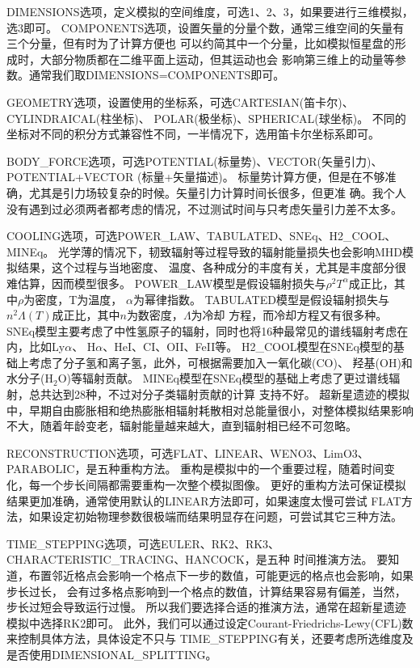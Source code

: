 DIMENSIONS选项，定义模拟的空间维度，可选1、2、3，如果要进行三维模拟，选3即可。
COMPONENTS选项，设置矢量的分量个数，通常三维空间的矢量有三个分量，但有时为了计算方便也
可以约简其中一个分量，比如模拟恒星盘的形成时，大部分物质都在二维平面上运动，但其运动也会
影响第三维上的动量等参数。通常我们取DIMENSIONS=COMPONENTS即可。

GEOMETRY选项，设置使用的坐标系，可选CARTESIAN(笛卡尔)、CYLINDRAICAL(柱坐标)、
POLAR(极坐标)、SPHERICAL(球坐标)。
不同的坐标对不同的积分方式兼容性不同，一半情况下，选用笛卡尔坐标系即可。

BODY\_FORCE选项，可选POTENTIAL(标量势)、VECTOR(矢量引力)、POTENTIAL+VECTOR
(标量+矢量描述)。
标量势计算方便，但是在不够准确，尤其是引力场较复杂的时候。矢量引力计算时间长很多，但更准
确。我个人没有遇到过必须两者都考虑的情况，不过测试时间与只考虑矢量引力差不太多。

COOLING选项，可选POWER\_LAW、TABULATED、SNEq、H2\_COOL、MINEq。
光学薄的情况下，韧致辐射等过程导致的辐射能量损失也会影响MHD模拟结果，这个过程与当地密度、
温度、各种成分的丰度有关，尤其是丰度部分很难估算，因而模型很多。
POWER\_LAW模型是假设辐射损失与$\rho^2T^{\alpha}$成正比，其中$\rho$为密度，T为温度，
$\alpha$为幂律指数。
TABULATED模型是假设辐射损失与$n^2\Lambda(T)$成正比，其中$n$为数密度，$\Lambda$为冷却
方程，而冷却方程又有很多种\citep{2017RMxAA..53..385F}。
SNEq模型主要考虑了中性氢原子的辐射，同时也将16种最常见的谱线辐射考虑在内，比如Ly$\alpha$、
H$\alpha$、HeI、CI、OII、FeII等。
H2\_COOL模型在SNEq模型的基础上考虑了分子氢和离子氢，此外，可根据需要加入一氧化碳(CO)、
羟基(OH)和水分子(H$_2$O)等辐射贡献。
MINEq模型在SNEq模型的基础上考虑了更过谱线辐射，总共达到28种，不过对分子类辐射贡献的计算
支持不好。
超新星遗迹的模拟中，早期自由膨胀相和绝热膨胀相辐射耗散相对总能量很小，对整体模拟结果影响
不大，随着年龄变老，辐射能量越来越大，直到辐射相已经不可忽略。

RECONSTRUCTION选项，可选FLAT、LINEAR、WENO3、LimO3、PARABOLIC，是五种重构方法。
重构是模拟中的一个重要过程，随着时间变化，每一个步长间隔都需要重构一次整个模拟图像。
更好的重构方法可保证模拟结果更加准确，通常使用默认的LINEAR方法即可，如果速度太慢可尝试
FLAT方法，如果设定初始物理参数很极端而结果明显存在问题，可尝试其它三种方法。

TIME\_STEPPING选项，可选EULER、RK2、RK3、CHARACTERISTIC\_TRACING、HANCOCK，是五种
时间推演方法。
要知道，布置邻近格点会影响一个格点下一步的数值，可能更远的格点也会影响，如果步长过长，
会有过多格点影响到一个格点的数值，计算结果容易有偏差，当然，步长过短会导致运行过慢。
所以我们要选择合适的推演方法，通常在超新星遗迹模拟中选择RK2即可。
此外，我们可以通过设定Courant-Friedrichs-Lewy(CFL)数来控制具体方法，具体设定不只与
TIME\_STEPPING有关，还要考虑所选维度及是否使用DIMENSIONAL\_SPLITTING。

